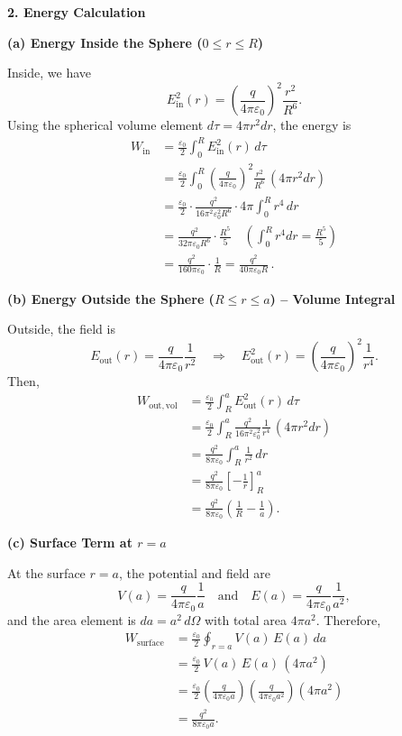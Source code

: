 \documentclass{article}
\begin{document}
\vspace{2mm}
\textbf{2. Energy Calculation}

\textbf{(a) Energy Inside the Sphere (\( 0\le r\le R \))}

Inside, we have
\[
E_{\mathrm{in}}^2(r)=\left(\frac{q}{4\pi\varepsilon_0}\right)^2 \frac{r^2}{R^6}.
\]
Using the spherical volume element \( d\tau = 4\pi r^2 dr \), the energy is
\begin{align*}
W_{\mathrm{in}} &= \frac{\varepsilon_0}{2}\int_{0}^{R} E_{\mathrm{in}}^2(r)\, d\tau \\
&=\frac{\varepsilon_0}{2}\int_{0}^{R}\left(\frac{q}{4\pi\varepsilon_0}\right)^2 \frac{r^2}{R^6}\,(4\pi r^2 dr) \\
&=\frac{\varepsilon_0}{2}\cdot \frac{q^2}{16\pi^2\varepsilon_0^2R^6}\cdot 4\pi \int_{0}^{R} r^4\, dr \\
&=\frac{q^2}{32\pi\varepsilon_0 R^6}\cdot \frac{R^5}{5} \quad \left(\int_{0}^{R}r^4dr=\frac{R^5}{5}\right)\\[1mm]
&=\frac{q^2}{160\pi\varepsilon_0}\cdot \frac{1}{R} = \frac{q^2}{40\pi\varepsilon_0 R}\,.
\end{align*}

\textbf{(b) Energy Outside the Sphere (\( R\le r\le a \)) – Volume Integral}

Outside, the field is
\[
E_{\mathrm{out}}(r)=\frac{q}{4\pi\varepsilon_0}\frac{1}{r^2} \quad\Longrightarrow\quad E_{\mathrm{out}}^2(r)=\left(\frac{q}{4\pi\varepsilon_0}\right)^2\frac{1}{r^4}.
\]
Then,
\begin{align*}
W_{\mathrm{out,vol}} &= \frac{\varepsilon_0}{2}\int_{R}^{a} E_{\mathrm{out}}^2(r)\, d\tau \\
&=\frac{\varepsilon_0}{2}\int_{R}^{a}\frac{q^2}{16\pi^2\varepsilon_0^2}\frac{1}{r^4}\,(4\pi r^2 dr) \\
&=\frac{q^2}{8\pi\varepsilon_0}\int_{R}^{a}\frac{1}{r^2}\, dr \\
&=\frac{q^2}{8\pi\varepsilon_0}\left[-\frac{1}{r}\right]_{R}^{a} \\
&=\frac{q^2}{8\pi\varepsilon_0}\left(\frac{1}{R}-\frac{1}{a}\right).
\end{align*}

\textbf{(c) Surface Term at \( r=a \)}

At the surface \( r=a \), the potential and field are
\[
V(a)=\frac{q}{4\pi\varepsilon_0}\frac{1}{a} \quad \text{and} \quad E(a)=\frac{q}{4\pi\varepsilon_0}\frac{1}{a^2},
\]
and the area element is \( da = a^2\, d\Omega \) with total area \( 4\pi a^2 \). Therefore,
\begin{align*}
W_{\mathrm{surface}} &= \frac{\varepsilon_0}{2}\oint_{r=a} V(a)\,E(a)\, da \\
&=\frac{\varepsilon_0}{2}\,V(a)\,E(a)\,(4\pi a^2) \\
&=\frac{\varepsilon_0}{2}\left(\frac{q}{4\pi\varepsilon_0 a}\right)\left(\frac{q}{4\pi\varepsilon_0 a^2}\right)(4\pi a^2) \\
&=\frac{q^2}{8\pi\varepsilon_0a}.
\end{align*}
\end{document}
